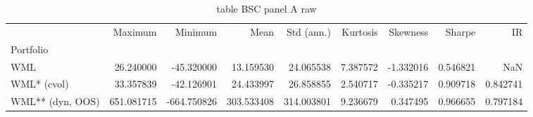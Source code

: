 \begin{table}[htbp]
  \centering
  \caption{table BSC panel A raw}
  \label{tab:table_BSC_panel_A_raw}
  \begin{tabular}{lrrrrrrrr}
\toprule
 & Maximum & Minimum & Mean & Std (ann.) & Kurtosis & Skewness & Sharpe & IR \\
Portfolio &  &  &  &  &  &  &  &  \\
\midrule
WML & 26.240000 & -45.320000 & 13.159530 & 24.065538 & 7.387572 & -1.332016 & 0.546821 & NaN \\
WML* (cvol) & 33.357839 & -42.126901 & 24.433997 & 26.858855 & 2.540717 & -0.335217 & 0.909718 & 0.842741 \\
WML** (dyn, OOS) & 651.081715 & -664.750826 & 303.533408 & 314.003801 & 9.236679 & 0.347495 & 0.966655 & 0.797184 \\
\bottomrule
\end{tabular}

\end{table}
